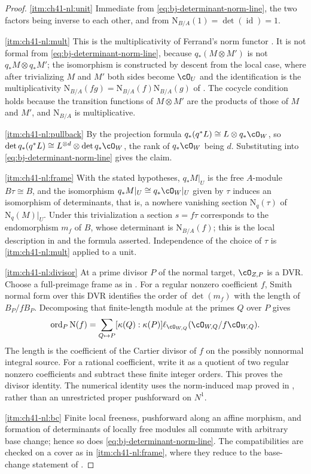 \begin{proof}
\cref{itm:ch41-nl:unit}  Immediate from
\eqref{eq:bj-determinant-norm-line}, the two factors being inverse to each
other, and from $\mathrm N_{B/A}(1)=\det(\operatorname{id})=1$.

\cref{itm:ch41-nl:mult}  This is the multiplicativity of Ferrand's norm
functor \cite[Proposition~3.3]{FerrandNorm}.  It is not formal from
\eqref{eq:bj-determinant-norm-line}, because $q_*(M\otimes M')$ is not
$q_*M\otimes q_*M'$; the isomorphism is constructed by descent from the
local case, where after trivializing $M$ and $M'$ both sides become
$\cO_U$ and the identification is the multiplicativity
$\mathrm N_{B/A}(fg)=\mathrm N_{B/A}(f)\mathrm N_{B/A}(g)$ of
.  The cocycle condition holds because the
transition functions of $M\otimes M'$ are the products of those of $M$
and $M'$, and $\mathrm N_{B/A}$ is multiplicative.

\cref{itm:ch41-nl:pullback}  By the projection formula
$q_*(q^*L)\cong L\otimes q_*\cO_W$, so
$\det q_*(q^*L)\cong L^{\otimes d}\otimes\det q_*\cO_W$, the rank of
$q_*\cO_W$ being $d$.  Substituting into
\eqref{eq:bj-determinant-norm-line} gives the claim.

\cref{itm:ch41-nl:frame}  With the stated hypotheses,
$q_*M|_U$ is the free $A$-module $B\tau\cong B$, and the isomorphism
$q_*M|_U\cong q_*\cO_W|_U$ given by $\tau$ induces an isomorphism of
determinants, that is, a nowhere vanishing section
$\mathrm N_q(\tau)$ of $\mathrm N_q(M)|_U$.  Under this trivialization a
section $s=f\tau$ corresponds to the endomorphism $m_f$ of $B$, whose
determinant is $\mathrm N_{B/A}(f)$; this is the local description in
 and the formula asserted.  Independence of the
choice of $\tau$ is \cref{itm:ch41-nl:mult} applied to a unit.

\cref{itm:ch41-nl:divisor}  At a prime divisor $P$ of the normal
target, $\cO_{Z,P}$ is a DVR.  Choose a full-preimage frame as in
.  For a regular nonzero coefficient $f$,
Smith normal form over this DVR identifies the order of $\det(m_f)$
with the length of $B_P/fB_P$.  Decomposing that finite-length module
at the primes $Q$ over $P$ gives
\[
 \operatorname{ord}_P\mathrm N(f)
 =\sum_{Q\mapsto P}[\kappa(Q):\kappa(P)]
       \ell_{\cO_{W,Q}}(\cO_{W,Q}/f\cO_{W,Q}).
\]
The length is the coefficient of the Cartier divisor of $f$ on the
possibly nonnormal integral source.  For a rational coefficient, write
it as a quotient of two regular nonzero coefficients and subtract
these finite integer orders.  This proves the divisor identity.
The numerical identity uses the norm-induced map proved in
, rather than an unrestricted
proper pushforward on $N^1$.

\cref{itm:ch41-nl:bc}  Finite local freeness, pushforward along an affine
morphism, and formation of determinants of locally free modules all commute
with arbitrary base change; hence so does
\eqref{eq:bj-determinant-norm-line}.  The compatibilities are checked on a
cover as in \cref{itm:ch41-nl:frame}, where they reduce to the base-change
statement of .
\end{proof}

